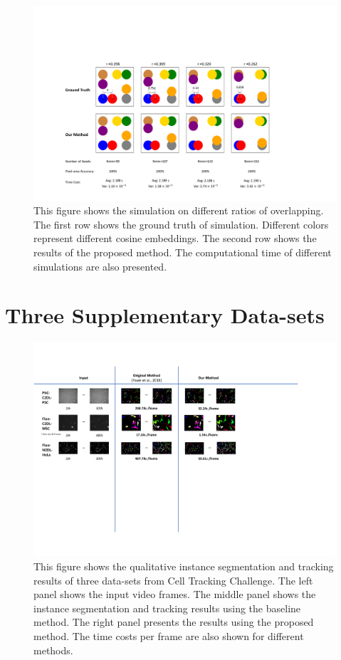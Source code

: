 \documentclass[journal,twoside,web]{ieeecolor}
\begin{document}
\begin{figure}[h]
\includegraphics[width=6.5 in]{ap1.pdf}
\centering
\caption{This figure shows the simulation on different ratios of overlapping. The first row shows the ground truth of simulation. Different colors represent different cosine embeddings. The second row shows the results of the proposed method. The computational time of different simulations are also presented.}
\label{figap1}
\end{figure}

\newpage
\section{Three Supplementary Data-sets}
\begin{figure}[h]
\includegraphics[width=6.5 in]{ap2.pdf}
\centering
\caption{This figure shows the qualitative instance segmentation and tracking results of three data-sets from Cell Tracking Challenge. The left panel shows the input video frames. The middle panel shows the instance segmentation and tracking results using the baseline method. The right panel presents the results using the proposed method. The time costs per frame are also shown for different methods. }
\label{figap2}
\end{figure}
\end{document}
